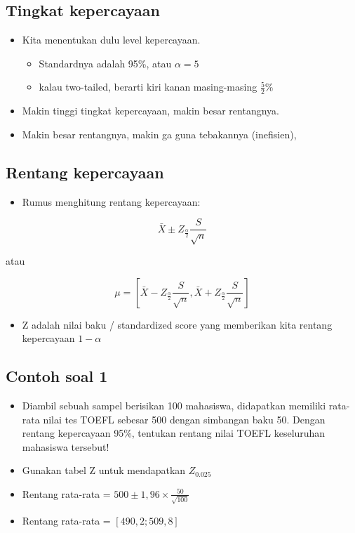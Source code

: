 \documentclass[
  letterpaper,
  DIV=11,
  numbers=noendperiod]{scrartcl}
\providecommand{\tightlist}{%
  \setlength{\itemsep}{0pt}\setlength{\parskip}{0pt}}\usepackage{longtable,booktabs,array}
\begin{document}
\subsection{Tingkat kepercayaan}\label{tingkat-kepercayaan}

\begin{itemize}
\item
  Kita menentukan dulu level kepercayaan.

  \begin{itemize}
  \item
    Standardnya adalah 95\%, atau \(\alpha=5%
    \)
  \item
    kalau two-tailed, berarti kiri kanan masing-masing \(\frac{5}{2}\%\)
  \end{itemize}
\item
  Makin tinggi tingkat kepercayaan, makin besar rentangnya.
\item
  Makin besar rentangnya, makin ga guna tebakannya (inefisien),
\end{itemize}

\subsection{Rentang kepercayaan}\label{rentang-kepercayaan-1}

\begin{itemize}
\tightlist
\item
  Rumus menghitung rentang kepercayaan:
\end{itemize}

\[
\bar{X} \pm Z_{\frac{\alpha}{2}} \frac{S}{\sqrt{n}}
\]

atau

\[
\mu=\left[ \bar{X}-Z_{\frac{\alpha}{2}} \frac{S}{\sqrt{n}}, \bar{X}+Z_{\frac{\alpha}{2}}\frac{S}{\sqrt{n}}\right]
\]

\begin{itemize}
\tightlist
\item
  Z adalah nilai baku / standardized score yang memberikan kita rentang
  kepercayaan \(1-\alpha\)
\end{itemize}

\subsection{Contoh soal 1}\label{contoh-soal-1-1}

\begin{itemize}
\item
  Diambil sebuah sampel berisikan 100 mahasiswa, didapatkan memiliki
  rata-rata nilai tes TOEFL sebesar 500 dengan simbangan baku 50. Dengan
  rentang kepercayaan 95\%, tentukan rentang nilai TOEFL keseluruhan
  mahasiswa tersebut!
\item
  Gunakan tabel Z untuk mendapatkan \(Z_{0.025}\)
\item
  Rentang rata-rata = \(500 \pm 1,96\times\frac{50}{\sqrt{100}}\)
\item
  Rentang rata-rata = \(\left[490,2;509,8\right]\)
\end{itemize}
\end{document}
